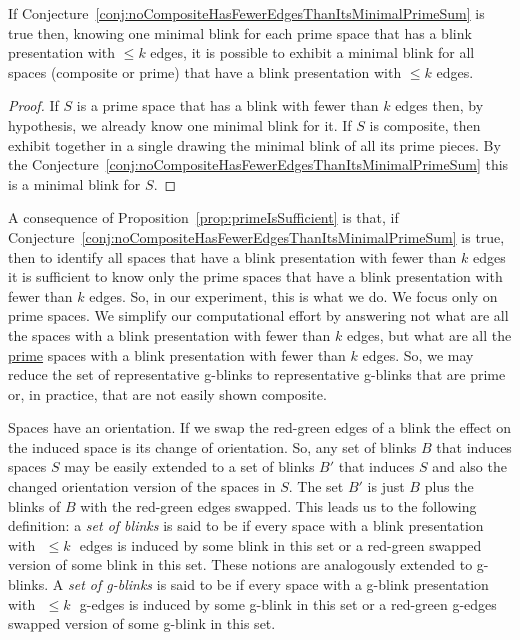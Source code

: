 \begin{proposition} \label{prop:primeIsSufficient}
If Conjecture~\ref{conj:noCompositeHasFewerEdgesThanItsMinimalPrimeSum} is true
then, knowing one minimal blink for each prime space that has a blink presentation
with $\leq k$ edges, it is possible to exhibit a minimal blink
for all spaces (composite or prime) that have a blink presentation with
$\leq k$ edges.
\end{proposition}
\begin{proof}
If $S$ is a prime space that has a blink with fewer than $k$ edges then,
by hypothesis, we already know one minimal blink for it. If $S$ is composite,
then exhibit together in a single drawing the minimal blink of all its prime
pieces. By the Conjecture~\ref{conj:noCompositeHasFewerEdgesThanItsMinimalPrimeSum}
this is a minimal blink for $S$.
\end{proof}

A consequence of Proposition~\ref{prop:primeIsSufficient} is that, if
Conjecture~\ref{conj:noCompositeHasFewerEdgesThanItsMinimalPrimeSum} is true, then
to identify all spaces that have a blink presentation with fewer than $k$ edges
it is sufficient to know only the prime spaces that have a blink
presentation with fewer than $k$ edges. So, in our experiment,
this is what we do. We focus only on prime spaces. We simplify our
computational effort by answering not what are all the spaces with
a blink presentation with fewer than $k$ edges, but what are all the
\underline{prime} spaces with a blink presentation with fewer than $k$
edges. So, we may reduce the set of representative g-blinks to
representative g-blinks that are prime or, in practice, that are
not easily shown composite.

Spaces have an orientation. If we swap the red-green edges of a
blink the effect on the induced space is its change of orientation.
So, any set of blinks $B$ that induces spaces $S$ may be easily
extended to a set of blinks $B'$ that induces $S$ and also the
changed orientation version of the spaces in $S$. The set $B'$ is
just $B$ plus the blinks of $B$ with the red-green edges swapped.
This leads us to the following definition: a {\em set of blinks} is
said to be {\em \kpu} if every space with a blink presentation with
$\,\,\leq k \,\,$ edges is induced by some blink in this set or a
red-green swapped version of some blink in this set. These notions
are analogously extended to g-blinks. A {\em set of g-blinks} is
said to be {\em \kpu} if every space with a g-blink presentation with
$\,\,\leq k \,\,$ g-edges is induced by some g-blink in this set or
a red-green g-edges swapped version of some g-blink in this set.

